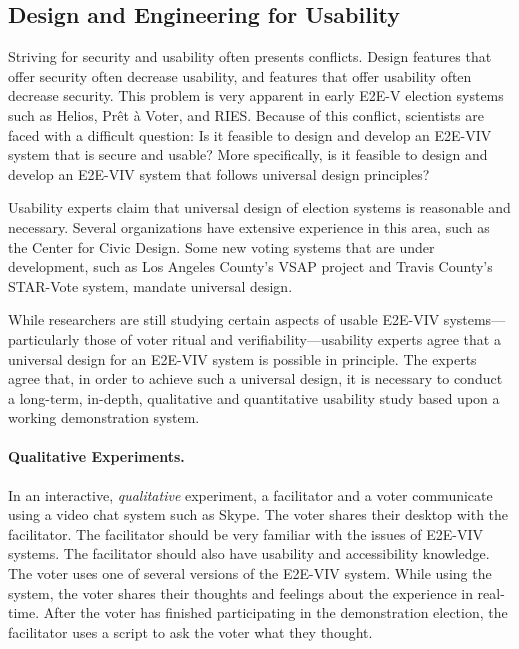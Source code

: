 \subsection{Design and Engineering for Usability}

Striving for security and usability often presents conflicts. Design
features that offer security often decrease usability, and features
that offer usability often decrease security. This problem is very
apparent in early E2E-V election systems such as Helios, Prêt à Voter,
and RIES. Because of this conflict, scientists are faced with a
difficult question: Is it feasible to design and develop an E2E-VIV
system that is secure and usable? More specifically, is it feasible to
design and develop an E2E-VIV system that follows universal design
principles?  

Usability experts claim that universal design of election systems is
reasonable and necessary. Several organizations have extensive
experience in this area, such as the Center for Civic Design. Some new
voting systems that are under development, such as Los Angeles
County's VSAP project and Travis County's STAR-Vote system, mandate
universal design. 

While researchers are still studying certain aspects of usable E2E-VIV
systems---particularly those of voter ritual and
verifiability---usability experts agree that a universal design for an
E2E-VIV system is possible in principle. The experts agree that, in
order to achieve such a universal design, it is necessary to conduct a
long-term, in-depth, qualitative and quantitative usability study
based upon a working demonstration system.

\paragraph{Qualitative Experiments.}
In an interactive, \emph{qualitative} experiment, a facilitator and a
voter communicate using a video chat system such as Skype. The voter
shares their desktop with the facilitator. The facilitator should be
very familiar with the issues of E2E-VIV systems. The facilitator
should also have usability and accessibility knowledge. The voter uses
one of several versions of the E2E-VIV system.  While using the
system, the voter shares their thoughts and feelings about the
experience in real-time. After the voter has finished participating in
the demonstration election, the facilitator uses a script to ask the
voter what they thought.

